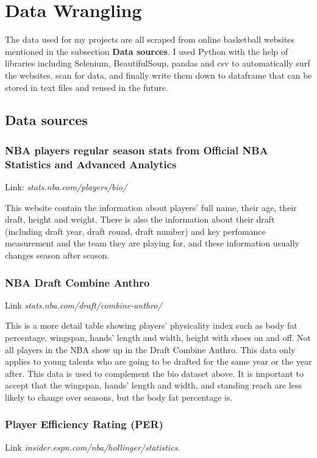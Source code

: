 \documentclass[a4paper,12pt,twoside]{article}
\numberwithin{equation}{section}
\begin{document}
\section{Data Wrangling}
The data used for my projects are all scraped from online basketball websites mentioned in the subsection \textbf{Data sources}. I used Python with the help of libraries including Selenium, BeautifulSoup, pandas and csv to automatically surf the websites, scan for data, and finally write them down to dataframe that can be stored in text files and reused in the future.
\subsection{Data sources}
\subsubsection{NBA players regular season stats from Official NBA Statistics and Advanced Analytics}Link: \textit{stats.nba.com/players/bio/} 

This website contain the information about players' full name, their age, their draft, height and weight. There is also the information about their draft (including draft year, draft round, draft number) and key perfomance measurement and the team they are playing for, and these information usually changes season after season. 

\subsubsection{NBA Draft Combine Anthro}
Link \textit{stats.nba.com/draft/combine-anthro/}

This is a more detail table showing players' physicality index such as body fat percentage, wingspan, hands' length and width, height with shoes on and off. Not all players in the NBA show up in the Draft Combine Anthro. This data only applies to  young talents who are going to be drafted for the same year or the year after. This data is used to complement the bio dataset above. It is important to accept that the wingspan, hands' length and width, and standing reach are less likely to change over seasons, but the body fat percentage is.

\subsubsection{Player Efficiency Rating (PER)} 
Link \textit{insider.espn.com/nba/hollinger/statistics}.
\end{document}
